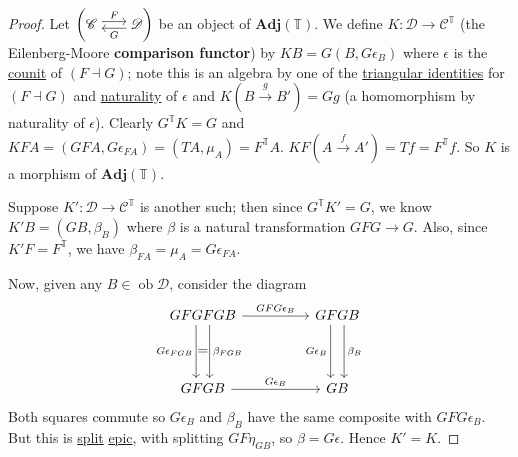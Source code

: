 \documentclass{article}
\DeclareMathOperator{\ob}{ob}
\newcommand{\cc}{\mathscr{C}}
\newcommand{\dc}{\mathscr{D}}
\newenvironment{tikzcdi}{\begin{tikzcd}[cramped, sep=scriptsize]}{\end{tikzcd}}
\let\to\longrightarrow
\begin{document}
\begin{proof}
  Let $\left(\begin{tikzcdi}\cc \rar[shift left]{F} & \dc \lar[shift left]{G}\end{tikzcdi}\right)$ be an object of $\mathbf{Adj}(\mathbb{T})$.
  We define $K: \dc \to \cc^\mathbb{T}$ (the Eilenberg-Moore \textbf{comparison functor}) by $KB = G(B, G\epsilon_B)$ where $\epsilon$ is the \hyperlink{def:counit}{counit} of $(F \dashv G)$; note this is an algebra by one of the \hyperlink{def:triId}{triangular identities} for $(F \dashv G)$ and \hyperlink{def:nattrans}{naturality} of $\epsilon$ and $K(B \overset{g}\to B') = Gg$ (a homomorphism by naturality of $\epsilon$).
  Clearly $G^\mathbb{T}K = G$ and $KFA = (GFA, G\epsilon_{FA}) = (TA, \mu_A) = F^\mathbb{T}A$.
  $KF(A\overset{f}\to A') = Tf = F^\mathbb{T} f$.
  So $K$ is a morphism of $\mathbf{Adj}(\mathbb{T})$.

  Suppose $K': \dc \to \cc^\mathbb{T}$ is another such; then since $G^\mathbb{T} K' = G$, we know $K' B = (GB, \beta_B)$ where $\beta$ is a natural transformation $GFG \to G$.
  Also, since $K'F = F^\mathbb{T}$, we have $\beta_{FA} = \mu_A = G\epsilon_{FA}$.

  Now, given any $B \in \ob \dc$, consider the diagram
  \begin{equation*}
    \begin{tikzcd}[column sep=huge, row sep=scriptsize]
    GFGFGB \arrow[dd,shift right=2,',"G\epsilon_{FGB}"] \arrow[dd,shift left=2,"\beta_{FGB}"] \rar{GFG\epsilon_B} & GFGB \arrow[dd,shift right=2,',"G\epsilon_B"] \arrow[dd,shift left=2,"\beta_B"] \\ =\\
    GFGB \rar{G\epsilon_B} & GB
  \end{tikzcd}
  \end{equation*}
  Both squares commute so $G\epsilon_B$ and $\beta_B$ have the same composite with $GFG\epsilon_B$.
  But this is \hyperlink{def:split}{split} \hyperlink{def:epic}{epic}, with splitting $GF\eta_{GB}$, so $\beta = G\epsilon$. Hence $K' = K$.


\end{proof}
\end{document}
